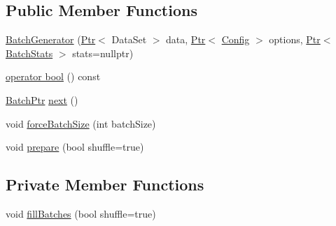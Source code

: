 \subsection*{Public Member Functions}
\begin{DoxyCompactItemize}
\item 
\hyperlink{classmarian_1_1data_1_1BatchGenerator_a26c6e2741b06916d4a42735cb66967fc}{Batch\+Generator} (\hyperlink{namespacemarian_ad1a373be43a00ef9ce35666145137b08}{Ptr}$<$ Data\+Set $>$ data, \hyperlink{namespacemarian_ad1a373be43a00ef9ce35666145137b08}{Ptr}$<$ \hyperlink{classmarian_1_1Config}{Config} $>$ options, \hyperlink{namespacemarian_ad1a373be43a00ef9ce35666145137b08}{Ptr}$<$ \hyperlink{classmarian_1_1data_1_1BatchStats}{Batch\+Stats} $>$ stats=nullptr)
\item 
\hyperlink{classmarian_1_1data_1_1BatchGenerator_a5ca9defe946185233011e58f144771dd}{operator bool} () const 
\item 
\hyperlink{classmarian_1_1data_1_1BatchGenerator_ae876f1ada46b7e7e3a4ea0ad45e9ee39}{Batch\+Ptr} \hyperlink{classmarian_1_1data_1_1BatchGenerator_a315e970451e563b5ef4d113bdff16e7f}{next} ()
\item 
void \hyperlink{classmarian_1_1data_1_1BatchGenerator_a071d0145d57e1cdf25cedb151eb5a874}{force\+Batch\+Size} (int batch\+Size)
\item 
void \hyperlink{classmarian_1_1data_1_1BatchGenerator_ad465fd5b81c4914e0301a7df72281179}{prepare} (bool shuffle=true)
\end{DoxyCompactItemize}
\subsection*{Private Member Functions}
\begin{DoxyCompactItemize}
\item 
void \hyperlink{classmarian_1_1data_1_1BatchGenerator_a88adc2d51793dffe06348c1d41b795a6}{fill\+Batches} (bool shuffle=true)
\end{DoxyCompactItemize}
